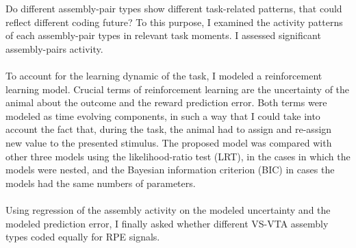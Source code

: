 Do different assembly-pair types show different task-related patterns, that could reflect different coding future? To this purpose, I examined the activity patterns of each assembly-pair types in relevant task moments. I assessed significant assembly-pairs activity.\\\\
To account for the learning dynamic of the task, I modeled a reinforcement learning model. Crucial terms of reinforcement learning are the uncertainty of the animal about the outcome and the reward prediction error. Both terms were modeled as time evolving components, in such a way that I could take into account the fact that, during the task, the animal had to assign and re-assign new value to the presented stimulus. The proposed model was compared with other three models using the likelihood-ratio test (LRT), in the cases in which the models were nested, and the Bayesian information criterion (BIC) in cases the models had the same numbers of parameters.\\\\
Using regression of the assembly activity on the modeled uncertainty and the modeled prediction error, I finally asked whether different VS-VTA assembly types coded equally for RPE signals.

